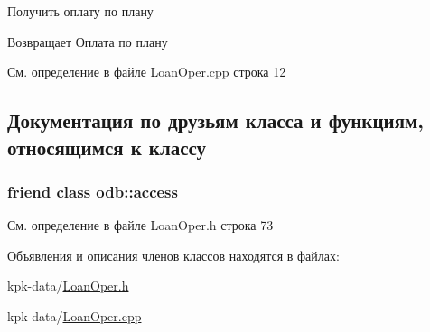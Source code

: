Получить оплату по плану 

\begin{DoxyReturn}{Возвращает}
Оплата по плану 
\end{DoxyReturn}


См. определение в файле Loan\+Oper.\+cpp строка 12



\subsection{Документация по друзьям класса и функциям, относящимся к классу}
\subsubsection[{\texorpdfstring{odb\+::access}{odb::access}}]{\setlength{\rightskip}{0pt plus 5cm}friend class odb\+::access\hspace{0.3cm}{\ttfamily [friend]}}\hypertarget{classkpk_1_1data_1_1_loan_oper_acb4d953abf85ae525f1d06a0c3a86a55}{}\label{classkpk_1_1data_1_1_loan_oper_acb4d953abf85ae525f1d06a0c3a86a55}


См. определение в файле Loan\+Oper.\+h строка 73



Объявления и описания членов классов находятся в файлах\+:\begin{DoxyCompactItemize}
\item 
kpk-\/data/\hyperlink{_loan_oper_8h}{Loan\+Oper.\+h}\item 
kpk-\/data/\hyperlink{_loan_oper_8cpp}{Loan\+Oper.\+cpp}\end{DoxyCompactItemize}
